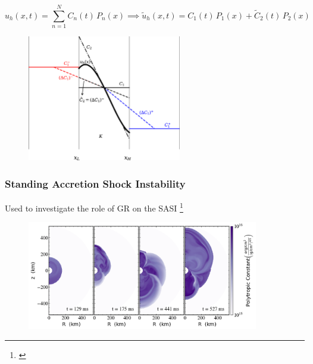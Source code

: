 \documentclass{beamer}
\begin{document}
\begin{frame}

  \Fontvi
  \begin{equation*}
  u_{h}\left(x,t\right)
  =\sum\limits_{n=1}^{N}
  C_{n}\left(t\right)\,P_{n}\left(x\right)\implies
  \tilde{u}_{h}\left(x,t\right)
  =C_{1}\left(t\right)\,P_{1}\left(x\right)
  +\tilde{C}_{2}\left(t\right)\,P_{2}\left(x\right)
  \end{equation*}

  \begin{figure}[htb!]
    \centering
    \includegraphics[width=0.6\textwidth]{fig.MinMod.jpeg}
  \end{figure}

\end{frame}

\begin{frame}
\frametitle{Standing Accretion Shock Instability}

  Used \thornado{} to investigate the role of GR on the SASI%
  \footnote{\citet{dem2020,dem2023}}

  \begin{figure}[htb!]
    \centering
    \includegraphics[width=0.9\textwidth]{fig.sasi.png}
  \end{figure}

\end{frame}
\end{document}
